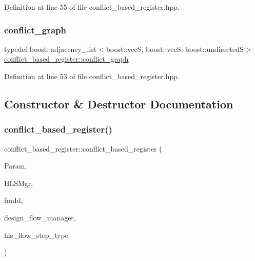 Definition at line 55 of file conflict\+\_\+based\+\_\+register.\+hpp.

\mbox{\label{classconflict__based__register_ae3dddabefe4d2f171c7076d0c1c22f05}} 
\subsubsection{\texorpdfstring{conflict\+\_\+graph}{conflict\_graph}}
{\footnotesize\ttfamily typedef boost\+::adjacency\+\_\+list$<$boost\+::vecS, boost\+::vecS, boost\+::undirectedS$>$ \hyperlink{classconflict__based__register_ae3dddabefe4d2f171c7076d0c1c22f05}{conflict\+\_\+based\+\_\+register\+::conflict\+\_\+graph}\hspace{0.3cm}{\ttfamily [protected]}}



Definition at line 53 of file conflict\+\_\+based\+\_\+register.\+hpp.



\subsection{Constructor \& Destructor Documentation}
\mbox{\label{classconflict__based__register_a435663400dc42783544165ab9b225e5a}} 
\subsubsection{\texorpdfstring{conflict\+\_\+based\+\_\+register()}{conflict\_based\_register()}}
{\footnotesize\ttfamily conflict\+\_\+based\+\_\+register\+::conflict\+\_\+based\+\_\+register (\begin{DoxyParamCaption}\item[{const \hyperlink{Parameter_8hpp_a37841774a6fcb479b597fdf8955eb4ea}{Parameter\+Const\+Ref}}]{Param,  }\item[{const \hyperlink{hls__manager_8hpp_acd3842b8589fe52c08fc0b2fcc813bfe}{H\+L\+S\+\_\+manager\+Ref}}]{H\+L\+S\+Mgr,  }\item[{unsigned int}]{fun\+Id,  }\item[{const Design\+Flow\+Manager\+Const\+Ref}]{design\+\_\+flow\+\_\+manager,  }\item[{const \hyperlink{hls__step_8hpp_ada16bc22905016180e26fc7e39537f8d}{H\+L\+S\+Flow\+Step\+\_\+\+Type}}]{hls\+\_\+flow\+\_\+step\+\_\+type }\end{DoxyParamCaption})}



